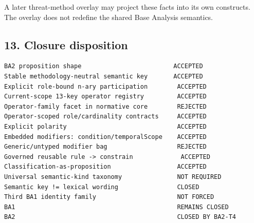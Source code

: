\documentclass[11pt,a4paper]{article}
\begin{document}
A later threat-method overlay may project these facts into its own constructs. The overlay does not redefine the shared Base Analysis semantics.

\subsection{13. Closure disposition}\label{closure-disposition}

\begin{verbatim}
BA2 proposition shape                         ACCEPTED
Stable methodology-neutral semantic key       ACCEPTED
Explicit role-bound n-ary participation        ACCEPTED
Current-scope 13-key operator registry         ACCEPTED
Operator-family facet in normative core        REJECTED
Operator-scoped role/cardinality contracts     ACCEPTED
Explicit polarity                              ACCEPTED
Embedded modifiers: condition/temporalScope    ACCEPTED
Generic/untyped modifier bag                   REJECTED
Governed reusable rule -> constrain             ACCEPTED
Classification-as-proposition                  ACCEPTED
Universal semantic-kind taxonomy               NOT REQUIRED
Semantic key != lexical wording                CLOSED
Third BA1 identity family                      NOT FORCED
BA1                                            REMAINS CLOSED
BA2                                            CLOSED BY BA2-T4
\end{verbatim}
\end{document}
